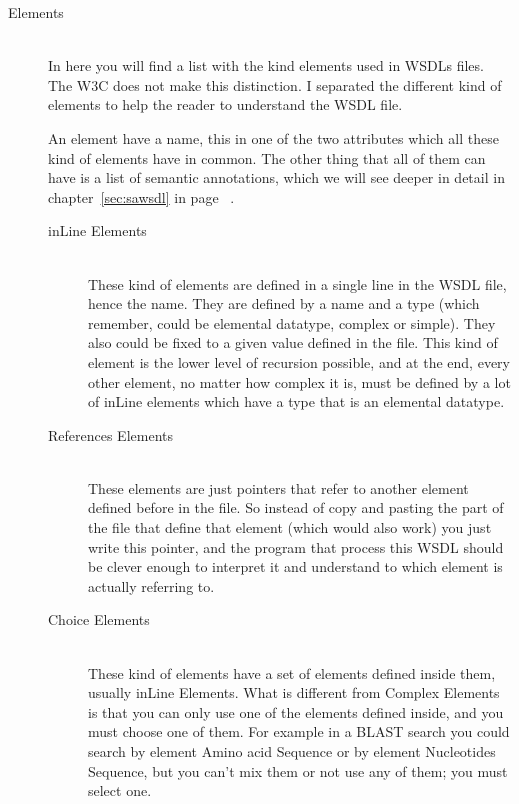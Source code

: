\documentclass[a4paper,10pt]{article}
\begin{document}
    \begin{description}
      \item[Elements] \hfill \\

      In here you will find a list with the kind elements used in WSDLs files. The W3C does not make this distinction. I separated the different kind of elements to help the reader to understand the WSDL file.\vspace{3 mm}

      An element have a name, this in one of the two attributes which all these kind of elements have in common. The other thing that all of them can have is a list of semantic annotations, which we will see deeper in detail in chapter~\ref{sec:sawsdl} in page ~\pageref{sec:sawsdl}.\vspace{3 mm}

      \begin{description}

	\item[inLine Elements] \hfill \\

	These kind of elements are defined in a single line in the WSDL file, hence the name. They are defined by a name and a type (which remember, could be elemental datatype, complex or simple). They also could be fixed to a given value defined in the file. This kind of element is the lower level of recursion possible, and at the end, every other element, no matter how complex it is, must be defined by a lot of inLine elements which have a type that is an elemental datatype.

	\item[References Elements] \hfill \\

	These elements are just pointers that refer to another element defined before in the file. So instead of copy and pasting the part of the file that define that element (which would also work) you just write this pointer, and the program that process this WSDL should be clever enough to interpret it and understand to which element is actually referring to.

	\item[Choice Elements] \hfill \\

	These kind of elements have a set of elements defined inside them, usually inLine Elements. What is different from Complex Elements is that you can only use one of the elements defined inside, and you must choose one of them. For example in a BLAST search you could search by element Amino acid Sequence or by element Nucleotides Sequence, but you can't mix them or not use any of them; you must select one.


\end{description}
\end{description}
\end{document}
